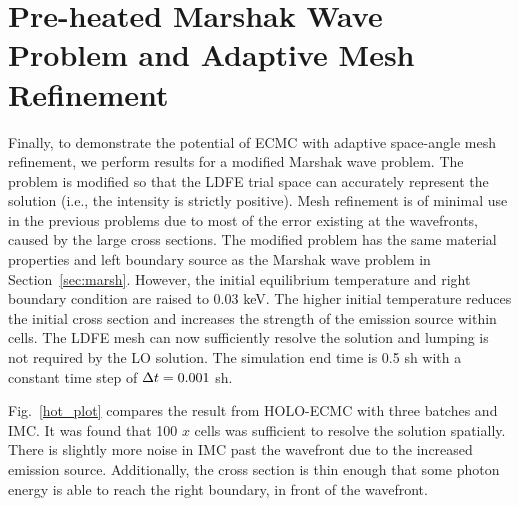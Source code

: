 \section{Pre-heated Marshak Wave Problem and Adaptive Mesh Refinement}

Finally, to demonstrate the potential of ECMC with adaptive space-angle mesh refinement, we perform
results for a modified Marshak wave problem. The problem is modified so that the LDFE
trial space can accurately represent the solution (i.e., the intensity is strictly
positive).  Mesh refinement is of minimal use in the previous problems due to most of
the error existing at the wavefronts, caused by the large cross sections.   The modified problem has the same material
properties and left boundary source as the Marshak wave problem in
Section~\ref{sec:marsh}.  However, the initial equilibrium
temperature and right boundary condition are raised to $0.03$ keV.   The higher initial temperature reduces the
initial cross section and increases the strength of the emission source within cells.  
The LDFE mesh can now sufficiently resolve the solution and lumping is
not required by the LO solution.  The simulation end time is 0.5 sh with a constant
time step of $\Delta t=0.001$ sh.  

Fig.~\ref{hot_plot} compares the result from HOLO-ECMC with three batches and IMC.
It was found that 100 $x$ cells was sufficient to resolve the solution spatially. There is slightly more noise in IMC past the wavefront due to the increased emission
source.  Additionally, the cross section is thin enough that some photon energy is able to
reach the right boundary, in front of the wavefront. 

